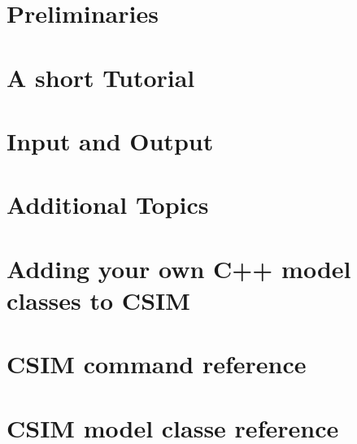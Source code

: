 \documentclass[11pt]{article}
\newcommand{\csim}{\textsf{CSIM} }
\newcommand{\hypertarget}[2]{#2}
\newcommand{\Section}[2]{\hypertarget{#2}{\section{#1}\label{#2}}}
\begin{document}
\sloppy

%
%
\latex{}
\html{}

%
%

\setcounter{tocdepth}{3}
\tableofcontents


\Section{Preliminaries}{sec:pre}




\clearpage

\Section{A short Tutorial}{sec:start}




\Section{Input and Output}{sec:inout}


 
%
%
%
% 


\Section{Additional Topics}{sec:additional}


 

\Section{Adding your own C++ model classes to \csim}{sec:usermodels}


 

\clearpage

\Section{\csim command reference}{sec:cmdref}





\Section{\csim model classe reference}{sec:clref}







\end{document}

